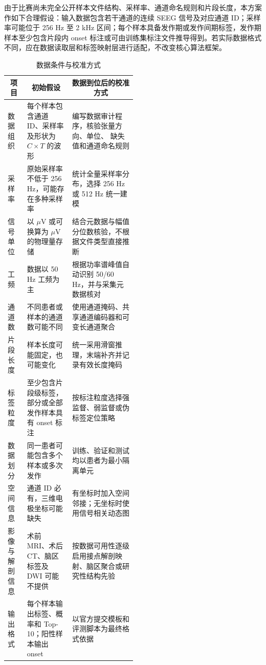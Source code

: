 \documentclass{cumcmthesis_v2}
\numberwithin{figure}{section} %
\numberwithin{table}{section} %
\begin{document}
由于比赛尚未完全公开样本文件结构、采样率、通道命名规则和片段长度，本方案作如下合理假设：输入数据包含若干通道的连续 SEEG 信号及对应通道 ID；采样率可能位于 256 Hz 至 2 kHz 区间；每个样本具备发作期或发作间期标签，发作期样本至少包含片段内 onset 标注或可由训练集标注文件推导得到。若实际数据格式不同，应在数据读取层和标签映射层进行适配，不改变核心算法框架。
\begin{table}[htbp]
    \centering
    \caption{数据条件与校准方式}
    \label{tab:data-conditions}

    \renewcommand{\arraystretch}{1.5}
    \setlength{\tabcolsep}{5pt}

    \begin{tabularx}{\linewidth}{@{}
        p{0.15\linewidth}
        p{0.35\linewidth}
        X
    @{}}
        \toprule[1pt]
        
        \multicolumn{1}{c}{\textbf{项目}} &
        \multicolumn{1}{c}{\textbf{初始假设}} &
        \multicolumn{1}{c}{\textbf{数据到位后的校准方式}}  \\
        \midrule

        数据组织 &
        每个样本包含通道 ID、采样率及形状为
        $C \times T$ 的波形 &
        编写数据审计程序，核验张量方向、单位、
        缺失值和通道命名规则  \\

        采样率&原始采样率不低于 256 Hz，可能存在多种采样率	& 统计全量采样率分布，选择 256 Hz 或 512 Hz 统一建模\\
        信号单位	& 以 $\mu$V 或可换算为 $\mu$V 的物理量存储	& 结合元数据与幅值分位数核验，不根据文件类型直接推断\\
        工频	& 数据以 50 Hz 工频为主	& 根据功率谱峰值自动识别 50/60 Hz，并与采集元数据核对\\
        通道数	& 不同患者或样本的通道数可能不同& 使用通道掩码、共享通道编码器和可变长通道聚合\\
        片段长度	& 样本长度可能固定，也可能变化	& 统一采用滑窗推理，末端补齐并记录有效长度掩码\\
        标签粒度	& 至少包含片段级标签，部分或全部发作样本具有 onset 标注	& 按标注粒度选择强监督、弱监督或伪标签定位策略\\
        数据划分& 	同一患者可能包含多个样本或多次发作	& 训练、验证和测试均以患者为最小隔离单元\\
        空间信息	& 通道 ID 必有，三维电极坐标可能缺失	& 有坐标时加入空间邻接；无坐标时使用信号相关动态图\\
        影像与解剖信息& 	术前 MRI、术后 CT、脑区标签及 DWI 可能不提供	& 按数据可用性逐级启用接点解剖映射、脑区聚合或研究性结构先验\\
        输出格式	& 每个样本输出标签、概率和 Top-10；阳性样本输出 onset	& 以官方提交模板和评测脚本为最终格式依据\\
        \bottomrule[1pt]

    \end{tabularx}
\end{table}
\end{document}
